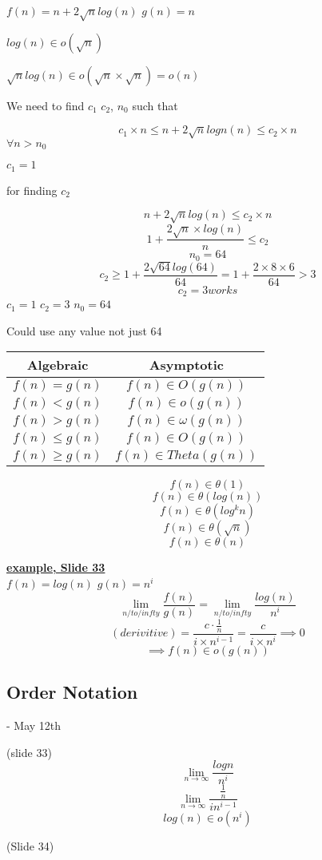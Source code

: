 \documentclass[12pt]{article}
\newcommand{\myt}[1]{\textbf{\underline{#1}}}
\begin{document}
	$f(n) = n + 2\sqrt{n}log(n)$ $g(n) = n$
	
	$log(n) \in o(\sqrt{n})$
	
	$\sqrt{n}log(n) \in o(\sqrt{n} \times \sqrt{n}) = o(n)$
	
	We need to find $c_1$ $c_2$, $n_0$ such that
	
	$$c_1 \times n \leq n + 2 \sqrt{n}logn(n) \leq c_2 \times n$$
	$\forall n > n_0$
	
	$c_1 = 1$
	
	for finding $c_2$
	
	$$n + 2\sqrt{n}log(n) \leq c_2 \times n$$
	$$1 + \frac{2\sqrt{n} \times log(n)}{n} \leq c_2$$
	$$n_0 = 64$$
	$$c_2 \geq 1 + \frac{2\sqrt{64}log(64)}{64} = 1 + \frac{2 \times 8 \times 6}{64} > 3$$
	$$c_2 = 3 works$$
	$c_1 = 1$ $c_2 = 3$ $n_0 = 64$
	
	Could use any value not just 64
	
	
	\begin{tabular}{c | c}
		Algebraic & Asymptotic \\ \hline
		$f(n) = g(n)$ & $f(n) \in O(g(n))$ \\ \hline
		$f(n) < g(n)$ & $f(n) \in o(g(n))$ \\ \hline
		$f(n) > g(n)$ & $f(n) \in \omega(g(n))$ \\ \hline
		$f(n) \leq g(n)$ & $f(n) \in O(g(n))$ \\ \hline
		$f(n) \geq g(n)$ & $f(n) \in Theta(g(n))$
	\end{tabular}
	
	$$f(n) \in \theta(1)$$
	$$f(n) \in \theta(log(n))$$
	$$f(n) \in \theta(log^kn)$$
	$$f(n) \in \theta(\sqrt{n})$$
	$$f(n) \in \theta(n)$$
	
	\myt{example, Slide 33}\\
	$f(n) = log(n)$ $g(n) = n^i$
	$$\lim_{n/to/infty}\frac{f(n)}{g(n)} = \lim_{n/to/infty}\frac{log(n)}{n^i}$$
	$$ (derivitive) = \frac{c \cdot \frac{1}{n}}{i\times n^{i-1}} = \frac{c}{i \times n^i} \implies 0$$
		$$ \implies f(n) \in o(g(n))$$
		
		\subsection*{Order Notation} - May 12th
		
		(slide 33)\\
		$$\lim_{n \rightarrow \infty } \frac{logn}{n^i}$$
		$$\lim_{n \rightarrow \infty} \frac{\frac{1}{n}}{in^{i-1}}$$
		$$log(n) \in o(n^i)$$
		
		(Slide 34)\\
		
\end{document}
